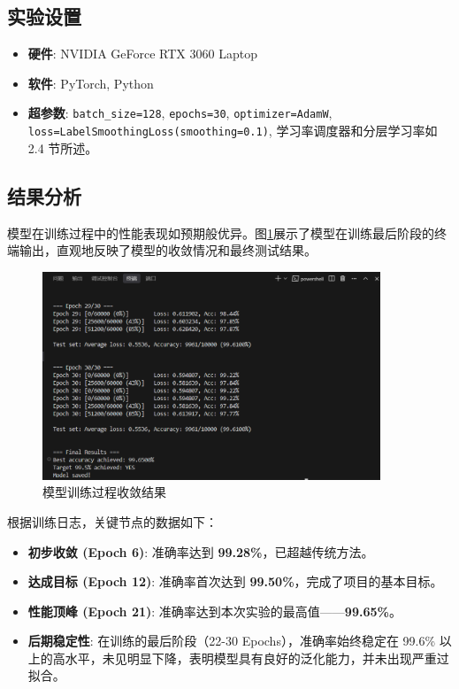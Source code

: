 \documentclass[UTF8]{ctexart}
\begin{document}
\subsection{实验设置}

\begin{itemize}
    \item \textbf{硬件}: NVIDIA GeForce RTX 3060 Laptop
    \item \textbf{软件}: PyTorch, Python
    \item \textbf{超参数}: \texttt{batch\_size=128}, \texttt{epochs=30}, \texttt{optimizer=AdamW}, \texttt{loss=LabelSmoothingLoss(smoothing=0.1)}, 学习率调度器和分层学习率如 2.4 节所述。
\end{itemize}

\subsection{结果分析}

模型在训练过程中的性能表现如预期般优异。图\ref{fig:result}展示了模型在训练最后阶段的终端输出，直观地反映了模型的收敛情况和最终测试结果。

\begin{figure}[h!]
    \centering
    \includegraphics[width=0.9\textwidth]{result.png}
    \caption{模型训练过程收敛结果}
    \label{fig:result}
\end{figure}

根据训练日志，关键节点的数据如下：

\begin{itemize}
    \item \textbf{初步收敛 (Epoch 6)}: 准确率达到 \textbf{99.28\%}，已超越传统方法。
    \item \textbf{达成目标 (Epoch 12)}: 准确率首次达到 \textbf{99.50\%}，完成了项目的基本目标。
    \item \textbf{性能顶峰 (Epoch 21)}: 准确率达到本次实验的最高值——\textbf{99.65\%}。
    \item \textbf{后期稳定性}: 在训练的最后阶段（22-30 Epochs），准确率始终稳定在 99.6\% 以上的高水平，未见明显下降，表明模型具有良好的泛化能力，并未出现严重过拟合。
\end{itemize}
\end{document}
